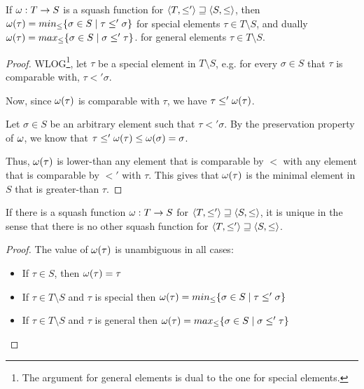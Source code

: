 \documentclass[main.tex]{subfiles}
\begin{document}
\begin{property}
    If $\omega: T \rightarrow S$ is a squash function for
    $\langle  T,  \leq'  \rangle \sqsupseteq \langle  S,  \leq  \rangle$,
    then $\omega(\tau) = min_{\leq} \{ \sigma \in S \mid \tau \leq' \sigma \}$
    for special elements $\tau \in T \setminus S$, and dually
    $\omega(\tau) = max_{\leq} \{ \sigma \in S \mid \sigma \leq' \tau \}$.
    for general elements $\tau \in T \setminus S$.
\end{property}
\begin{proof}
    WLOG\footnote{The argument for general elements is dual to the one for special
        elements.},
    let $\tau$ be a special element in $T \setminus S$, e.g. for every
    $\sigma \in S$ that $\tau$ is comparable with, $\tau \less' \sigma$.

    Now, since $\omega(\tau)$ is comparable with $\tau$, we have
    $\tau \leq' \omega(\tau)$.

    Let $\sigma \in S$ be an arbitrary element such that $\tau \less' \sigma$.
    By the preservation property of $\omega$, we know that
    $\tau \leq' \omega(\tau) \leq \omega(\sigma) = \sigma$.

    Thus, $\omega(\tau)$ is lower-than any element that is comparable
    by $\less$ with any element that is comparable by $\less'$ with $\tau$.
    This gives that $\omega(\tau)$ is the minimal element in $S$ that is
    greater-than $\tau$.
\end{proof}
\begin{corollary}\label{prop:squash:unique}
    If there is a squash function $\omega: T \rightarrow S$ for
    $\langle  T,  \leq'  \rangle \sqsupseteq \langle  S,  \leq  \rangle$,
    it is unique in the sense that there is no other squash function for
    $\langle  T,  \leq'  \rangle \sqsupseteq \langle  S,  \leq  \rangle$.
\end{corollary}
\begin{proof}
    The value of $\omega(\tau)$ is unambiguous in all cases:
    \begin{itemize}
        \item If $\tau \in S$, then $\omega(\tau) = \tau$
        \item If $\tau \in T \setminus S$ and $\tau$ is special
            then $\omega(\tau) = min_{\leq} \{ \sigma \in S \mid \tau \leq' \sigma \}$
        \item If $\tau \in T \setminus S$ and $\tau$ is general
            then $\omega(\tau) = max_{\leq} \{ \sigma \in S \mid \sigma \leq' \tau \}$
    \end{itemize}
\end{proof}
\end{document}
